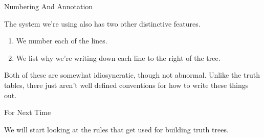 \documentclass[
  ignorenonframetext,
]{beamer}
\providecommand{\tightlist}{%
  \setlength{\itemsep}{0pt}\setlength{\parskip}{0pt}}
\renewcommand{\,}{\text{, }}
\begin{document}
\begin{frame}{Numbering And Annotation}
\protect\hypertarget{numbering-and-annotation}{}

The system we're using also has two other distinctive features.

\begin{enumerate}
\tightlist
\item
  We number each of the lines. \pause
\item
  We list why we're writing down each line to the right of the tree.
  \pause
\end{enumerate}

Both of these are somewhat idiosyncratic, though not abnormal. Unlike
the truth tables, there just aren't well defined conventions for how to
write these things out.

\end{frame}

\begin{frame}{For Next Time}
\protect\hypertarget{for-next-time}{}

We will start looking at the rules that get used for building truth
trees.

\end{frame}
\end{document}
